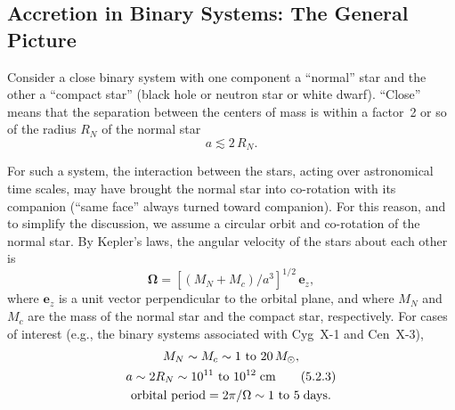 
\subsection{Accretion in Binary Systems: The General Picture}
\label{sec:5.2}

Consider a close binary system with one component a ``normal'' star and the
other a ``compact star'' (black hole or neutron star or white dwarf).  ``Close''
means that the separation between the centers of mass is within a factor~2 or
so of the radius $R_N$ of the normal star
\begin{equation}
a \lesssim 2\,R_N. \tag{5.2.1}
\end{equation}

For such a system, the interaction between the stars, acting over astronomical
time scales, may have brought the normal star into co-rotation with its
companion (``same face'' always turned toward companion).  For this reason,
and to simplify the discussion, we assume a circular orbit and co-rotation
of the normal star.  By Kepler's laws, the angular velocity of the stars
about each other is
\begin{equation}
\boldsymbol{\Omega} = \left[(M_N + M_c)/a^3\right]^{1/2}\,\mathbf{e}_z,
\tag{5.2.2}
\end{equation}
where $\mathbf{e}_z$ is a unit vector perpendicular to the orbital plane, and
where $M_N$ and $M_c$ are the mass of the normal star and the compact star,
respectively.  For cases of interest (e.g., the binary systems associated
with Cyg~X-1 and Cen~X-3),
\begin{gather}
M_N \sim M_c \sim 1 \text{ to } 20\,M_\odot, \notag\\
a \sim 2R_N \sim 10^{11} \text{ to } 10^{12}\;\text{cm} \tag{5.2.3}\\
\text{orbital period} = 2\pi/\Omega \sim 1 \text{ to } 5\;\text{days.}
\notag
\end{gather}

